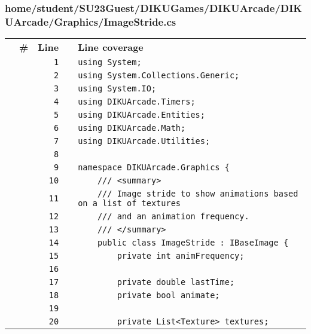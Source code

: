 \documentclass[a4paper,landscape,10pt]{article}
\begin{document}
\subsubsection{home/student/SU23Guest/DIKUGames/DIKUArcade/DIKUArcade/Graphics/ImageStride.cs}
\begin{longtable}[l]{lrrll}
\textbf{} & \textbf{\#} & \textbf{Line} & \textbf{} & \textbf{Line coverage}\\
\cellcolor{gray} &  & \verb~1~ & & \verb~using System;~\\
\cellcolor{gray} &  & \verb~2~ & & \verb~using System.Collections.Generic;~\\
\cellcolor{gray} &  & \verb~3~ & & \verb~using System.IO;~\\
\cellcolor{gray} &  & \verb~4~ & & \verb~using DIKUArcade.Timers;~\\
\cellcolor{gray} &  & \verb~5~ & & \verb~using DIKUArcade.Entities;~\\
\cellcolor{gray} &  & \verb~6~ & & \verb~using DIKUArcade.Math;~\\
\cellcolor{gray} &  & \verb~7~ & & \verb~using DIKUArcade.Utilities;~\\
\cellcolor{gray} &  & \verb~8~ & & \verb~~\\
\cellcolor{gray} &  & \verb~9~ & & \verb~namespace DIKUArcade.Graphics {~\\
\cellcolor{gray} &  & \verb~10~ & & \verb~    /// <summary>~\\
\cellcolor{gray} &  & \verb~11~ & & \verb~    /// Image stride to show animations based on a list of textures~\\
\cellcolor{gray} &  & \verb~12~ & & \verb~    /// and an animation frequency.~\\
\cellcolor{gray} &  & \verb~13~ & & \verb~    /// </summary>~\\
\cellcolor{gray} &  & \verb~14~ & & \verb~    public class ImageStride : IBaseImage {~\\
\cellcolor{gray} &  & \verb~15~ & & \verb~        private int animFrequency;~\\
\cellcolor{gray} &  & \verb~16~ & & \verb~~\\
\cellcolor{gray} &  & \verb~17~ & & \verb~        private double lastTime;~\\
\cellcolor{gray} &  & \verb~18~ & & \verb~        private bool animate;~\\
\cellcolor{gray} &  & \verb~19~ & & \verb~~\\
\cellcolor{gray} &  & \verb~20~ & & \verb~        private List<Texture> textures;~\\

\end{longtable}
\end{document}
